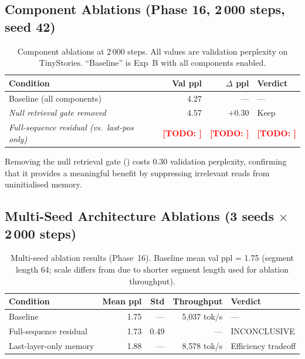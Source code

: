 \documentclass{article}
\providecommand{\todo}[1]{\textcolor{red}{\textbf{[TODO: #1]}}}
\begin{document}
\subsection{Component Ablations (Phase 16, 2\,000 steps, seed 42)}

\begin{table}[h]
  \centering
  \small
  \caption{Component ablations at 2\,000 steps.  All values are validation perplexity
    on TinyStories.  ``Baseline'' is Exp~B with all components enabled.}
  \label{tab:ablation-components}
  \begin{tabular}{lrrl}
    \toprule
    \textbf{Condition} & \textbf{Val ppl} & \textbf{$\Delta$ ppl} & \textbf{Verdict} \\
    \midrule
    Baseline (all components) & 4.27 & --- & --- \\
    \midrule
    \textit{Null retrieval gate removed} & 4.57 & $+0.30$ & Keep \\
    \textit{Full-sequence residual (vs.\ last-pos only)} & \todo{} & \todo{} & \todo{} \\
    \bottomrule
  \end{tabular}
\end{table}

Removing the null retrieval gate () costs 0.30 validation
perplexity, confirming that it provides a meaningful benefit by suppressing irrelevant
reads from uninitialised memory.

\subsection{Multi-Seed Architecture Ablations (3 seeds $\times$ 2\,000 steps)}

\begin{table}[h]
  \centering
  \small
  \caption{Multi-seed ablation results (Phase~16).  Baseline mean val ppl = 1.75
    (segment length 64; scale differs from  due to shorter
    segment length used for ablation throughput).}
  \label{tab:ablation-multiseed}
  \begin{tabular}{lrrrl}
    \toprule
    \textbf{Condition} & \textbf{Mean ppl} & \textbf{Std} & \textbf{Throughput} & \textbf{Verdict} \\
    \midrule
    Baseline                     & 1.75 & --- & 5{,}037 tok/s & --- \\
    Full-sequence residual       & 1.73 & 0.49 & ---          & INCONCLUSIVE \\
    Last-layer-only memory       & 1.88 & ---  & 8{,}578 tok/s & Efficiency tradeoff \\
    \bottomrule
  \end{tabular}
\end{table}
\end{document}
